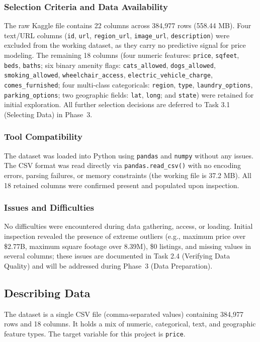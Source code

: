 \subsubsection{Selection Criteria and Data Availability}
\noindent
The raw Kaggle file contains 22 columns across 384,977 rows (558.44 MB). Four text/URL columns (\texttt{id}, \texttt{url}, \texttt{region\_url}, \texttt{image\_url}, \texttt{description}) were excluded from the working dataset, as they carry no predictive signal for price modeling. The remaining 18 columns (four numeric features: \texttt{price}, \texttt{sqfeet}, \texttt{beds}, \texttt{baths}; six binary amenity flags: \texttt{cats\_allowed}, \texttt{dogs\_allowed}, \texttt{smoking\_allowed}, \texttt{wheelchair\_access}, \texttt{electric\_vehicle\_charge}, \texttt{comes\_furnished}; four multi-class categoricals: \texttt{region}, \texttt{type}, \texttt{laundry\_options}, \texttt{parking\_options}; two geographic fields: \texttt{lat}, \texttt{long}; and \texttt{state}) were retained for initial exploration. All further selection decisions are deferred to Task 3.1 (Selecting Data) in Phase~3.

\subsubsection{Tool Compatibility}
\noindent
The dataset was loaded into Python using \texttt{pandas} and \texttt{numpy} without any issues. The CSV format was read directly via \texttt{pandas.read\_csv()} with no encoding errors, parsing failures, or memory constraints (the working file is 37.2 MB). All 18 retained columns were confirmed present and populated upon inspection.

\subsubsection{Issues and Difficulties}
\noindent
No difficulties were encountered during data gathering, access, or loading. Initial inspection revealed the presence of extreme outliers (e.g., maximum price over \$2.77B, maximum square footage over 8.39M), \$0 listings, and missing values in several columns; these issues are documented in Task 2.4 (Verifying Data Quality) and will be addressed during Phase~3 (Data Preparation).


\subsection{Describing Data}
\noindent
The dataset is a single CSV file (comma-separated values) containing 384,977 rows and 18 columns. It holds a mix of numeric, categorical, text, and geographic feature types. The target variable for this project is \texttt{price}.

